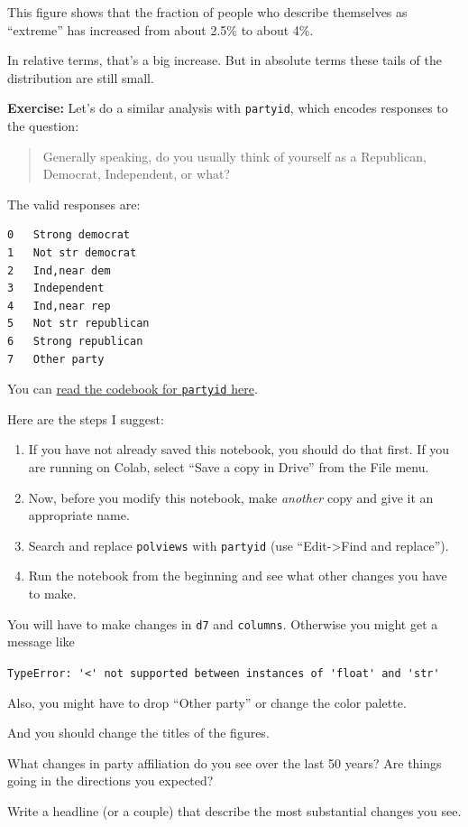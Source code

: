 This figure shows that the fraction of people who describe themselves as
``extreme'' has increased from about 2.5\% to about 4\%.

In relative terms, that's a big increase. But in absolute terms these
tails of the distribution are still small.

\textbf{Exercise:} Let's do a similar analysis with
\passthrough{\lstinline!partyid!}, which encodes responses to the
question:

\begin{quote}
Generally speaking, do you usually think of yourself as a Republican,
Democrat, Independent, or what?
\end{quote}

The valid responses are:

\begin{lstlisting}
0   Strong democrat
1   Not str democrat
2   Ind,near dem
3   Independent
4   Ind,near rep
5   Not str republican
6   Strong republican
7   Other party
\end{lstlisting}

You can
\href{https://gssdataexplorer.norc.org/projects/52787/variables/141/vshow}{read
the codebook for \passthrough{\lstinline!partyid!} here}.

Here are the steps I suggest:

\begin{enumerate}
\def\labelenumi{\arabic{enumi})}
\item
  If you have not already saved this notebook, you should do that first.
  If you are running on Colab, select ``Save a copy in Drive'' from the
  File menu.
\item
  Now, before you modify this notebook, make \emph{another} copy and
  give it an appropriate name.
\item
  Search and replace \passthrough{\lstinline!polviews!} with
  \passthrough{\lstinline!partyid!} (use ``Edit-\textgreater Find and
  replace'').
\item
  Run the notebook from the beginning and see what other changes you
  have to make.
\end{enumerate}

You will have to make changes in \passthrough{\lstinline!d7!} and
\passthrough{\lstinline!columns!}. Otherwise you might get a message
like

\passthrough{\lstinline!TypeError: '<' not supported between instances of 'float' and 'str'!}

Also, you might have to drop ``Other party'' or change the color
palette.

And you should change the titles of the figures.

What changes in party affiliation do you see over the last 50 years? Are
things going in the directions you expected?

Write a headline (or a couple) that describe the most substantial
changes you see.


